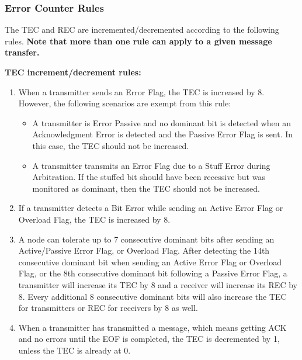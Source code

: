 \documentclass[main\_\_EN.tex]{subfiles}
\begin{document}
\subsubsection{Error Counter Rules}

The TEC and REC are incremented/decremented according to the following rules. \textbf{Note that more than one rule can apply to a given message transfer.}

\textbf{TEC increment/decrement rules:}
\begin{enumerate}
    \item When a transmitter sends an Error Flag, the TEC is increased by 8. However, the following scenarios are exempt from this rule:
    \begin{itemize}
        \item A transmitter is Error Passive and no dominant bit is detected when an Acknowledgment Error is detected and the Passive Error Flag is sent. In this case, the TEC should not be increased.
        \item A transmitter transmits an Error Flag due to a Stuff Error during Arbitration. If the stuffed bit should have been recessive but was monitored as dominant, then the TEC should not be increased.
    \end{itemize}
    \item If a transmitter detects a Bit Error while sending an Active Error Flag or Overload Flag, the TEC is increased by 8.
    \item A node can tolerate up to 7 consecutive dominant bits after sending an Active/Passive Error Flag, or Overload Flag. After detecting the 14th consecutive dominant bit when sending an Active Error Flag or Overload Flag, or the 8th consecutive dominant bit following a Passive Error Flag, a transmitter will increase its TEC by 8 and a receiver will increase its REC by 8. Every additional 8 consecutive dominant bits will also increase the TEC for transmitters or REC for receivers by 8 as well.
    \item When a transmitter has transmitted a message, which means getting ACK and no errors until the EOF is completed, the TEC is decremented by 1, unless the TEC is already at 0.
\end{enumerate}
\end{document}
